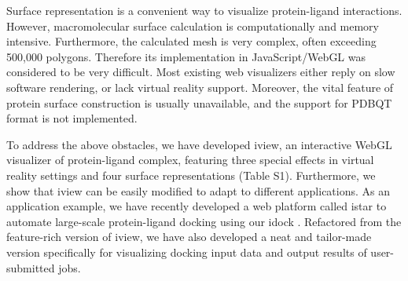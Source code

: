 \documentclass{bioinfo}
\begin{document}
Surface representation is a convenient way to visualize protein-ligand interactions. However, macromolecular surface calculation is computationally and memory intensive. Furthermore, the calculated mesh is very complex, often exceeding 500,000 polygons. Therefore its implementation in JavaScript/WebGL was considered to be very difficult. Most existing web visualizers either reply on slow software rendering, or lack virtual reality support. Moreover, the vital feature of protein surface construction is usually unavailable, and the support for PDBQT format is not implemented.

To address the above obstacles, we have developed iview, an interactive WebGL visualizer of protein-ligand complex, featuring three special effects in virtual reality settings and four surface representations (Table S1). Furthermore, we show that iview can be easily modified to adapt to different applications. As an application example, we have recently developed a web platform called istar to automate large-scale protein-ligand docking using our idock \citep{1153}. Refactored from the feature-rich version of iview, we have also developed a neat and tailor-made version specifically for visualizing docking input data and output results of user-submitted jobs.
\end{document}
